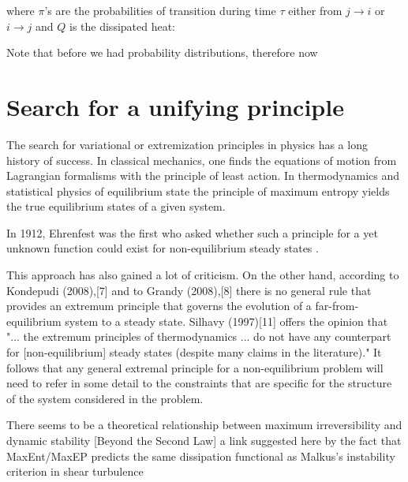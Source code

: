 \documentclass[a4paper,12pt]{article}
\begin{document}
where $\pi$'s are the probabilities of transition during time $\tau$ either from $ j\to i$ or $ i \to j $ and $Q$ is the dissipated heat:

Note that before we had probability distributions, therefore now 



\section{Search for a unifying principle}

The search for variational or extremization principles in physics has a long history of success. In classical mechanics, one finds the equations of motion from Lagrangian formalisms with the principle of least action. In thermodynamics and statistical physics of equilibrium state the principle of maximum entropy yields the true equilibrium states of a given system. 

In 1912, Ehrenfest was the first who asked whether such a principle for a yet unknown function could exist for non-equilibrium steady states . 

This approach has also gained a lot of criticism.
On the other hand, according to Kondepudi (2008),[7] and to Grandy (2008),[8] there is no general rule that provides an extremum principle that governs the evolution of a far-from-equilibrium system to a steady state. 
Silhavy (1997)[11] offers the opinion that "... the extremum principles of thermodynamics ... do not have any counterpart for [non-equilibrium] steady states (despite many claims in the literature)." It follows that any general extremal principle for a non-equilibrium problem will need to refer in some detail to the constraints that are specific for the structure of the system considered in the problem.

There seems to be a theoretical relationship between maximum irreversibility and dynamic stability [Beyond the Second Law] a link suggested here by the fact that MaxEnt/MaxEP predicts the same dissipation functional as Malkus's instability criterion in shear turbulence
\end{document}
